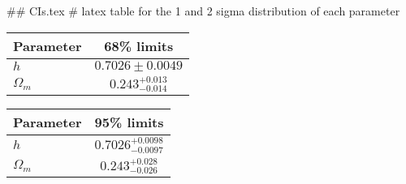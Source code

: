 ## CIs.tex
# latex table for the 1 and 2 sigma distribution of each parameter

\begin{tabular} { l  c}
 Parameter &  68\% limits\\
\hline
{\boldmath$h              $} & $0.7026\pm 0.0049          $\\
{\boldmath$\Omega_m       $} & $0.243^{+0.013}_{-0.014}   $\\
\hline
\end{tabular}

\begin{tabular} { l  c}
 Parameter &  95\% limits\\
\hline
{\boldmath$h              $} & $0.7026^{+0.0098}_{-0.0097}$\\
{\boldmath$\Omega_m       $} & $0.243^{+0.028}_{-0.026}   $\\
\hline
\end{tabular}
